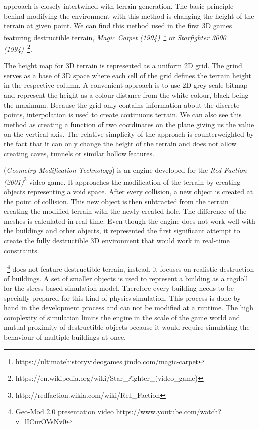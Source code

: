  approach is closely intertwined with terrain generation. The basic principle behind modifying the environment with this method is changing the height of the terrain at given point. We can find this method used in the first 3D games featuring destructible terrain, \eg \emph{Magic Carpet (1994)}~\footnote{https://ultimatehistoryvideogames.jimdo.com/magic-carpet} or \emph{Starfighter 3000 (1994)}~\footnote{https://en.wikipedia.org/wiki/Star\_Fighter\_(video\_game)}.

The height map for 3D terrain is represented as a uniform 2D grid. The grind serves as a base of 3D space where each cell of the grid defines the terrain height in the respective column.  A convenient approach is to use 2D grey-scale bitmap and represent the height as a colour distance from the white colour, black being the maximum. Because the grid only contains information about the discrete points, interpolation is used to create continuous terrain. We can also see this method as creating a function of two coordinates on the plane giving us the value on the vertical axis. The relative simplicity of the approach is counterweighted by the fact that it can only change the height of the terrain and does not allow creating caves, tunnels or similar hollow features.

 (\emph{Geometry Modification Technology}\cite{geomod}) is an engine developed for the \emph{Red Faction (2001)}\footnote{http://redfaction.wikia.com/wiki/Red\_Faction} video game. It approaches the modification of the terrain by creating objects representing a void space. After every collision, a new object is created at the point of collision. This new object is then subtracted from the terrain creating the modified terrain with the newly created hole. The difference of the meshes is calculated in real time. Even though the engine does not work well with the buildings and other objects, it represented the first significant attempt to create the fully destructible 3D environment that would work in real-time constraints.

~\cite{geomod}\footnote{Geo-Mod 2.0 presentation video https://www.youtube.com/watch?v=lICurOVsNv0} does not feature destructible terrain, instead, it focuses on realistic destruction of buildings. A set of smaller objects is used to represent a building as a ragdoll for the stress-based simulation model. Therefore every building needs to be specially prepared for this kind of physics simulation. This process is done by hand in the development process and can not be modified at a runtime. The high complexity of simulation limits the engine in the scale of the game world and mutual proximity of destructible objects because it would require simulating the behaviour of multiple buildings at once.


